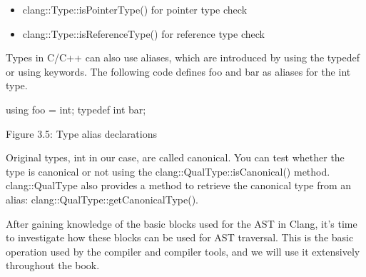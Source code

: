 \begin{itemize}
\item
clang::Type::isPointerType() for pointer type check

\item
clang::Type::isReferenceType() for reference type check
\end{itemize}

Types in C/C++ can also use aliases, which are introduced by using the typedef or using keywords. The following code defines foo and bar as aliases for the int type.

\begin{cpp}
using foo = int;
typedef int bar;
\end{cpp}

\begin{center}
Figure 3.5: Type alias declarations
\end{center}

Original types, int in our case, are called canonical. You can test whether the type is canonical or not using the clang::QualType::isCanonical() method. clang::QualType also provides a method to retrieve the canonical type from an alias: clang::QualType::getCanonicalType().

After gaining knowledge of the basic blocks used for the AST in Clang, it's time to investigate how these blocks can be used for AST traversal. This is the basic operation used by the compiler and compiler tools, and we will use it extensively throughout the book.








































